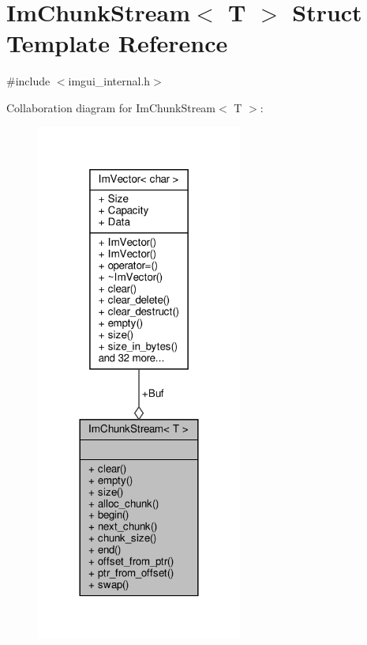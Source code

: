 \hypertarget{structImChunkStream}{}\section{Im\+Chunk\+Stream$<$ T $>$ Struct Template Reference}
\label{structImChunkStream}


{\ttfamily \#include $<$imgui\+\_\+internal.\+h$>$}



Collaboration diagram for Im\+Chunk\+Stream$<$ T $>$\+:
\nopagebreak
\begin{figure}[H]
\begin{center}
\leavevmode
\includegraphics[width=192pt]{structImChunkStream__coll__graph}
\end{center}
\end{figure}
